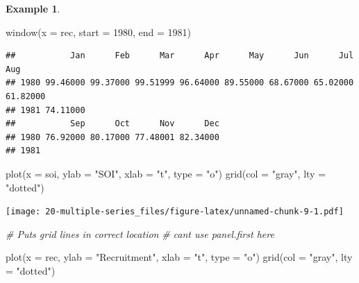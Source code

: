 \documentclass[
]{book}
\newenvironment{Shaded}{\begin{snugshade}}{\end{snugshade}}
\newcommand{\AttributeTok}[1]{\textcolor[rgb]{0.77,0.63,0.00}{#1}}
\newcommand{\CommentTok}[1]{\textcolor[rgb]{0.56,0.35,0.01}{\textit{#1}}}
\newcommand{\DecValTok}[1]{\textcolor[rgb]{0.00,0.00,0.81}{#1}}
\newcommand{\FunctionTok}[1]{\textcolor[rgb]{0.00,0.00,0.00}{#1}}
\newcommand{\NormalTok}[1]{#1}
\newcommand{\StringTok}[1]{\textcolor[rgb]{0.31,0.60,0.02}{#1}}
\theoremstyle{definition}
\theoremstyle{definition}
\newtheorem{example}{Example}[chapter]
\theoremstyle{definition}
\theoremstyle{definition}
\theoremstyle{remark}
\begin{document}
\begin{example}
\begin{Shaded}
\begin{Highlighting}[]
\FunctionTok{window}\NormalTok{(}\AttributeTok{x =}\NormalTok{ rec, }\AttributeTok{start =} \DecValTok{1980}\NormalTok{, }\AttributeTok{end =} \DecValTok{1981}\NormalTok{)}
\end{Highlighting}
\end{Shaded}

\begin{verbatim}
##           Jan      Feb      Mar      Apr      May      Jun      Jul      Aug
## 1980 99.46000 99.37000 99.51999 96.64000 89.55000 68.67000 65.02000 61.82000
## 1981 74.11000                                                               
##           Sep      Oct      Nov      Dec
## 1980 76.92000 80.17000 77.48001 82.34000
## 1981
\end{verbatim}

\begin{Shaded}
\begin{Highlighting}[]
\FunctionTok{plot}\NormalTok{(}\AttributeTok{x =}\NormalTok{ soi, }\AttributeTok{ylab =} \StringTok{"SOI"}\NormalTok{, }\AttributeTok{xlab =} \StringTok{"t"}\NormalTok{, }\AttributeTok{type =} \StringTok{"o"}\NormalTok{)}
\FunctionTok{grid}\NormalTok{(}\AttributeTok{col =} \StringTok{"gray"}\NormalTok{, }\AttributeTok{lty =} \StringTok{"dotted"}\NormalTok{) }
\end{Highlighting}
\end{Shaded}

\texttt{[image: 20-multiple-series\_files/figure-latex/unnamed-chunk-9-1.pdf]}

\begin{Shaded}
\begin{Highlighting}[]
\CommentTok{\# Puts grid lines in correct location}
\CommentTok{\# can\textquotesingle{}t use panel.first here                            }
\end{Highlighting}
\end{Shaded}

\begin{Shaded}
\begin{Highlighting}[]
\FunctionTok{plot}\NormalTok{(}\AttributeTok{x =}\NormalTok{ rec, }\AttributeTok{ylab =} \StringTok{"Recruitment"}\NormalTok{, }\AttributeTok{xlab =} \StringTok{"t"}\NormalTok{, }\AttributeTok{type =} 
    \StringTok{"o"}\NormalTok{)}
\FunctionTok{grid}\NormalTok{(}\AttributeTok{col =} \StringTok{"gray"}\NormalTok{, }\AttributeTok{lty =} \StringTok{"dotted"}\NormalTok{) }
\end{Highlighting}
\end{Shaded}


\end{example}
\end{document}
